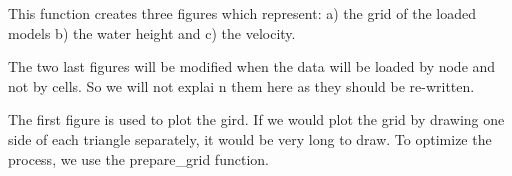 \documentclass[letterpaper,10pt,english]{sphinxmanual}
\begin{document}
\begin{fulllineitems}
\begin{quote}
\begin{description}
\begin{itemize}
\end{itemize}

\end{description}\end{quote}


This function creates three figures which represent: a) the grid of the loaded models b) the water height and
c) the velocity.

The two last figures will be modified when the data will be loaded by node and not by cells. So we will not explai
n them here as they should be re-written.

The first figure is used to plot the gird. If we would plot the grid by drawing one side of each triangle
separately, it would be very long to draw. To optimize the process, we use the prepare\_grid function.

\end{fulllineitems}

\end{document}
